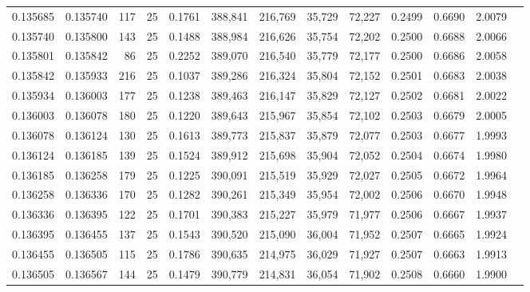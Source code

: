 \begin{tabular}{rrrrrrrrrrrrr}
0.135685 & 0.135740 &   117 &  25 &                                     0.1761 & 388,841 & 216,769 &  35,729 &  72,227 & 0.2499 & 0.6690 & 2.0079 \\
0.135740 & 0.135800 &   143 &  25 &                                     0.1488 & 388,984 & 216,626 &  35,754 &  72,202 & 0.2500 & 0.6688 & 2.0066 \\
0.135801 & 0.135842 &    86 &  25 &                                     0.2252 & 389,070 & 216,540 &  35,779 &  72,177 & 0.2500 & 0.6686 & 2.0058 \\
0.135842 & 0.135933 &   216 &  25 &                                     0.1037 & 389,286 & 216,324 &  35,804 &  72,152 & 0.2501 & 0.6683 & 2.0038 \\
0.135934 & 0.136003 &   177 &  25 &                                     0.1238 & 389,463 & 216,147 &  35,829 &  72,127 & 0.2502 & 0.6681 & 2.0022 \\
0.136003 & 0.136078 &   180 &  25 &                                     0.1220 & 389,643 & 215,967 &  35,854 &  72,102 & 0.2503 & 0.6679 & 2.0005 \\
0.136078 & 0.136124 &   130 &  25 &                                     0.1613 & 389,773 & 215,837 &  35,879 &  72,077 & 0.2503 & 0.6677 & 1.9993 \\
0.136124 & 0.136185 &   139 &  25 &                                     0.1524 & 389,912 & 215,698 &  35,904 &  72,052 & 0.2504 & 0.6674 & 1.9980 \\
0.136185 & 0.136258 &   179 &  25 &                                     0.1225 & 390,091 & 215,519 &  35,929 &  72,027 & 0.2505 & 0.6672 & 1.9964 \\
0.136258 & 0.136336 &   170 &  25 &                                     0.1282 & 390,261 & 215,349 &  35,954 &  72,002 & 0.2506 & 0.6670 & 1.9948 \\
0.136336 & 0.136395 &   122 &  25 &                                     0.1701 & 390,383 & 215,227 &  35,979 &  71,977 & 0.2506 & 0.6667 & 1.9937 \\
0.136395 & 0.136455 &   137 &  25 &                                     0.1543 & 390,520 & 215,090 &  36,004 &  71,952 & 0.2507 & 0.6665 & 1.9924 \\
0.136455 & 0.136505 &   115 &  25 &                                     0.1786 & 390,635 & 214,975 &  36,029 &  71,927 & 0.2507 & 0.6663 & 1.9913 \\
0.136505 & 0.136567 &   144 &  25 &                                     0.1479 & 390,779 & 214,831 &  36,054 &  71,902 & 0.2508 & 0.6660 & 1.9900 \\

\end{tabular}
